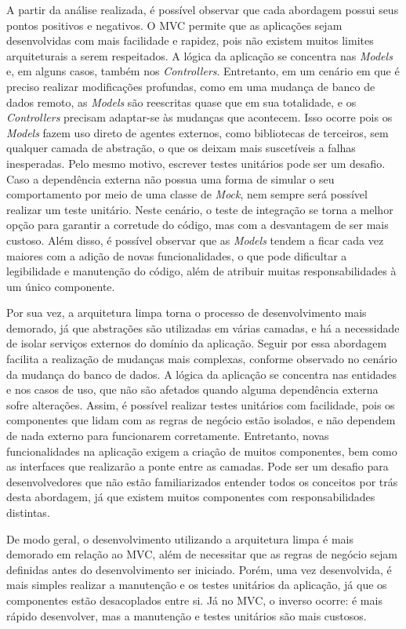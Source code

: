 
A partir da análise realizada, é possível observar que cada abordagem possui seus pontos positivos e negativos.
O MVC permite que as aplicações sejam desenvolvidas com mais facilidade e rapidez, pois não existem muitos limites arquiteturais a serem respeitados.
A lógica da aplicação se concentra nas \emph{Models} e, em alguns casos, também nos \emph{Controllers}.
Entretanto, em um cenário em que é preciso realizar modificações profundas, como em uma mudança de banco de dados remoto, as \emph{Models} são reescritas quase que em sua totalidade, e os \emph{Controllers} precisam adaptar-se às mudanças que acontecem.
Isso ocorre pois os \emph{Models} fazem uso direto de agentes externos, como bibliotecas de terceiros, sem qualquer camada de abstração, o que os deixam mais suscetíveis a falhas inesperadas.
Pelo mesmo motivo, escrever testes unitários pode ser um desafio.
Caso a dependência externa não possua uma forma de simular o seu comportamento por meio de uma classe de \emph{Mock}, nem sempre será possível realizar um teste unitário.
Neste cenário, o teste de integração se torna a melhor opção para garantir a corretude do código, mas com a desvantagem de ser mais custoso.
Além disso, é possível observar que as \emph{Models} tendem a ficar cada vez maiores com a adição de novas funcionalidades, o que pode dificultar a legibilidade e manutenção do código, além de atribuir muitas responsabilidades à um único componente.

Por sua vez, a arquitetura limpa torna o processo de desenvolvimento mais demorado, já que abstrações são utilizadas em várias camadas, e há a necessidade de isolar serviços externos do domínio da aplicação.
Seguir por essa abordagem facilita a realização de mudanças mais complexas, conforme observado no cenário da mudança do banco de dados.
A lógica da aplicação se concentra nas entidades e nos casos de uso, que não são afetados quando alguma dependência externa sofre alterações.
Assim, é possível realizar testes unitários com facilidade, pois os componentes que lidam com as regras de negócio estão isolados, e não dependem de nada externo para funcionarem corretamente.
Entretanto, novas funcionalidades na aplicação exigem a criação de muitos componentes, bem como as interfaces que realizarão a ponte entre as camadas.
Pode ser um desafio para desenvolvedores que não estão familiarizados entender todos os conceitos por trás desta abordagem, já que existem muitos componentes com responsabilidades distintas.

De modo geral, o desenvolvimento utilizando a arquitetura limpa é mais demorado em relação ao MVC, além de necessitar que as regras de negócio sejam definidas antes do desenvolvimento ser iniciado.
Porém, uma vez desenvolvida, é mais simples realizar a manutenção e os testes unitários da aplicação, já que os componentes estão desacoplados entre si.
Já no MVC, o inverso ocorre: é mais rápido desenvolver, mas a manutenção e testes unitários são mais custosos.

